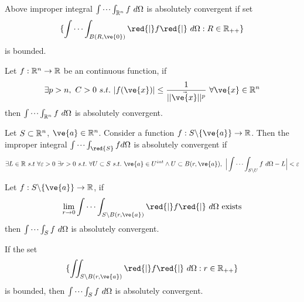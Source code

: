 \documentclass[11pt]{article}
\begin{document}
				\begin{corollary}[Equivalence]
					Above improper integral $\idotsint_{\R^n}f\ d\Omega$ is absolutely convergent if set
					\begin{equation}
						\{\idotsint_{B(R, \ve{0})}\red{|}f\red{|}\ d\Omega: R \in \R_{++}\}
					\end{equation}
					is bounded.
				\end{corollary}
				
				\begin{corollary}
					Let $f: \mathbb{R}^n \to \mathbb{R}$ be an continuous function, if 
					\begin{equation}
						\exists p > n,\ C > 0\ s.t.\ |f(\ve{x})| \leq \frac{1}{\norm{\ve{x}}^p}\ \forall \ve{x} \in \R^n
					\end{equation}
					then $\idotsint_{\R^n}f\ d\Omega$ is absolutely convergent.
				\end{corollary}
	
				\begin{definition}
					Let $S \subset \mathbb{R}^n$, $\ve{a} \in \R^n$. Consider a function $f: S \backslash \{\ve{a}\} \to \R$. Then the improper integral $\idotsint_{\red{S}}f d\Omega$ is absolutely convergent if 
					\begin{equation}
						\exists L \in \R\ s.t\ \forall \varepsilon > 0\ \exists r > 0\ s.t.\ \forall U \subset S\ s.t.\ \ve{a} \in U^{int} \land U \subset B(r, \ve{a}),\ \Big|
							\idotsint_{S \backslash U}f\ d\Omega - L
						\Big| < \varepsilon
					\end{equation}
				\end{definition}
				
				\begin{theorem}
					Let $f: S\backslash \{\ve{a}\} \to \R$, if
					\begin{equation}
						\lim_{r\to 0}\idotsint_{S \backslash B(r, \ve{a})}\red{|}f\red{|}\ d\Omega \tx{ exists}
					\end{equation}
					then $\idotsint_S f\ d\Omega$ is absolutely convergent.
				\end{theorem}
				
				\begin{corollary}[Equivalence]
					If the set
					\begin{equation}
						\{\iint_{S \backslash B(r, \ve{a})} \red{|}f\red{|}\ d\Omega: r \in \R_{++}\}
					\end{equation}
					is bounded, then $\idotsint_S f\ d\Omega$ is absolutely convergent.
				\end{corollary}
				
\end{document}
